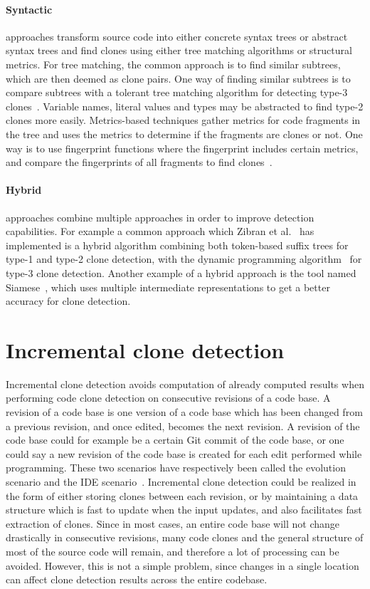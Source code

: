 \paragraph{Syntactic} approaches transform source code into either concrete syntax trees
or abstract syntax trees and find clones using either tree matching algorithms or
structural metrics. For tree matching, the common approach is to find similar subtrees,
which are then deemed as clone pairs. One way of finding similar subtrees is to compare
subtrees with a tolerant tree matching algorithm for detecting type-3
clones~\cite{ASTCloneDetection}. Variable names, literal values and types may be
abstracted to find type-2 clones more easily. Metrics-based techniques gather metrics for
code fragments in the tree and uses the metrics to determine if the fragments are clones
or not. One way is to use fingerprint functions where the fingerprint includes certain
metrics, and compare the fingerprints of all fragments to find clones~\cite{Deckard}.

\paragraph{Hybrid} approaches combine multiple approaches in order to improve detection
capabilities. For example a common approach which Zibran et
al.~\cite{Zibran_real_time_search} has implemented is a hybrid algorithm combining both
token-based suffix trees for type-1 and type-2 clone detection, with the dynamic
programming algorithm~\cite{BakerSparseDynamicProgramming} for type-3 clone detection.
Another example of a hybrid approach is the tool named
Siamese~\cite{SiameseScalableAndIncrementalClone}, which uses multiple intermediate
representations to get a better accuracy for clone detection.


\section{Incremental clone detection}

Incremental clone detection avoids computation of already computed results when performing
code clone detection on consecutive revisions of a code base.  A revision of a code base
is one version of a code base which has been changed from a previous revision, and once
edited, becomes the next revision.  A revision of the code base could for example be a
certain Git commit of the code base, or one could say a new revision of the code base is
created for each edit performed while programming. These two scenarios have respectively
been called the evolution scenario and the IDE
scenario~\cite{GodeIncrementalCloneDetection}. Incremental clone detection could be
realized in the form of either storing clones between each revision, or by maintaining a
data structure which is fast to update when the input updates, and also facilitates fast
extraction of clones. Since in most cases, an entire code base will not change drastically
in consecutive revisions, many code clones and the general structure of most of the source
code will remain, and therefore a lot of processing can be avoided. However, this is not a
simple problem, since changes in a single location can affect clone detection results
across the entire codebase.


